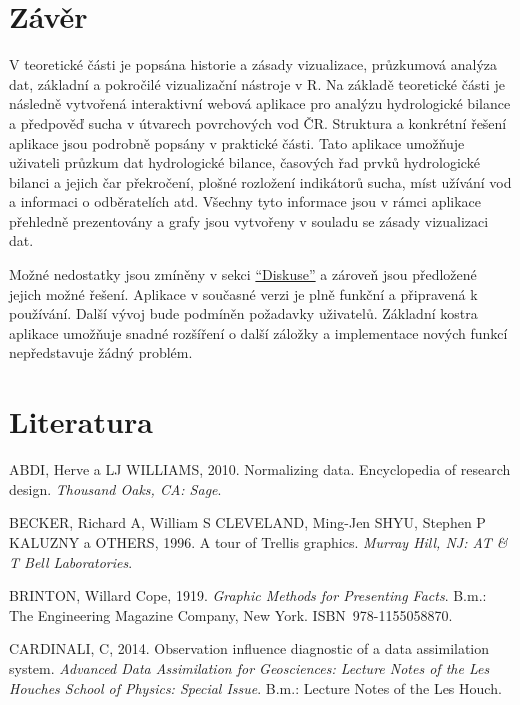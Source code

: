 \documentclass[12pt,]{article}
\begin{document}
\newpage

\section*{Závěr}\label{zaver}

\qquad V teoretické části je popsána historie a zásady vizualizace,
průzkumová analýza dat, základní a pokročilé vizualizační nástroje v R.
Na základě teoretické části je následně vytvořená interaktivní webová
aplikace pro analýzu hydrologické bilance a předpověď sucha v útvarech
povrchových vod ČR. Struktura a konkrétní řešení aplikace jsou podrobně
popsány v praktické části. Tato aplikace umožňuje uživateli průzkum dat
hydrologické bilance, časových řad prvků hydrologické bilanci a jejich
čar překročení, plošné rozložení indikátorů sucha, míst užívání vod a
informaci o odběratelích atd. Všechny tyto informace jsou v rámci
aplikace přehledně prezentovány a grafy jsou vytvořeny v souladu se
zásady vizualizaci dat.

\qquad Možné nedostatky jsou zmíněny v sekci
\protect\hyperlink{diskuse}{\enquote{Diskuse}} a zároveň jsou předložené
jejich možné řešení. Aplikace v současné verzi je plně funkční a
připravená k používání. Další vývoj bude podmíněn požadavky uživatelů.
Základní kostra aplikace umožňuje snadné rozšíření o další záložky a
implementace nových funkcí nepředstavuje žádný problém.

\newpage

\section{Literatura}\label{literatura}

\label{literatura}

\hypertarget{refs}{}
\hypertarget{ref-normalizing}{}
ABDI, Herve a LJ WILLIAMS, 2010. Normalizing data. Encyclopedia of
research design. \emph{Thousand Oaks, CA: Sage}.

\hypertarget{ref-trellisplot}{}
BECKER, Richard A, William S CLEVELAND, Ming-Jen SHYU, Stephen P KALUZNY
a OTHERS, 1996. A tour of Trellis graphics. \emph{Murray Hill, NJ: AT \&
T Bell Laboratories}.

\hypertarget{ref-brinton_1919}{}
BRINTON, Willard Cope, 1919. \emph{Graphic Methods for Presenting
Facts}. B.m.: The Engineering Magazine Company, New York.
ISBN~978-1155058870.

\hypertarget{ref-leverages_regression}{}
CARDINALI, C, 2014. Observation influence diagnostic of a data
assimilation system. \emph{Advanced Data Assimilation for Geosciences:
Lecture Notes of the Les Houches School of Physics: Special Issue}.
B.m.: Lecture Notes of the Les Houch.
\end{document}
